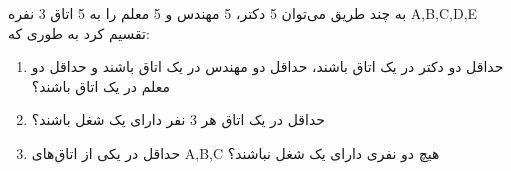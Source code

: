 \p    
به چند طریق می‌توان 5 دکتر، 5 مهندس و 5 معلم را به 5 اتاق 3 نفره A,B,C,D,E
تقسیم کرد به طوری که:
\begin{enumerate}
\item
حداقل دو دکتر در یک اتاق باشند، حداقل دو مهندس در یک اتاق باشند و حداقل دو معلم در یک اتاق باشند؟
\item
حداقل در یک اتاق هر 3 نفر دارای یک شغل باشند؟
\item
حداقل در یکی از اتاق‌های 
A,B,C
هیچ دو نفری دارای یک شغل نباشند؟
\end{enumerate}
